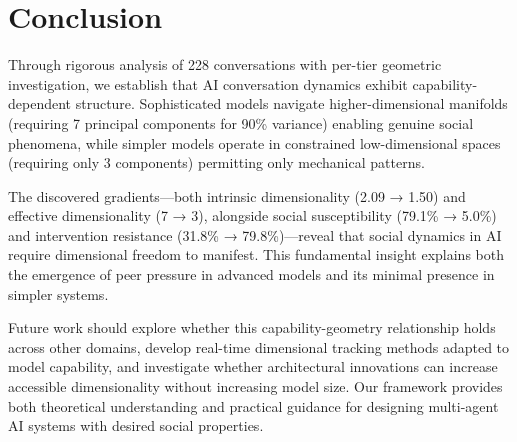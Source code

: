 \documentclass[11pt,letterpaper]{article}
\newcommand{\totalConversations}{228}
\newcommand{\fullReasoningPCOne}{31.8\%}
\newcommand{\noReasoningPCOne}{79.8\%}
\newcommand{\fullReasoningIntrinsicDim}{2.09}
\newcommand{\noReasoningIntrinsicDim}{1.50}
\newcommand{\fullReasoningPCANinety}{7}
\newcommand{\noReasoningPCANinety}{3}
\newcommand{\fullReasoningPeerPressure}{79.1\%}
\newcommand{\nonReasoningPeerPressure}{5.0\%}
\begin{document}
\section{Conclusion}

Through rigorous analysis of \totalConversations{} conversations with per-tier geometric investigation, we establish that AI conversation dynamics exhibit capability-dependent structure. Sophisticated models navigate higher-dimensional manifolds (requiring \fullReasoningPCANinety{} principal components for 90\% variance) enabling genuine social phenomena, while simpler models operate in constrained low-dimensional spaces (requiring only \noReasoningPCANinety{} components) permitting only mechanical patterns.

The discovered gradients—both intrinsic dimensionality (\fullReasoningIntrinsicDim{} → \noReasoningIntrinsicDim{}) and effective dimensionality (\fullReasoningPCANinety{} → \noReasoningPCANinety{}), alongside social susceptibility (\fullReasoningPeerPressure{} → \nonReasoningPeerPressure{}) and intervention resistance (\fullReasoningPCOne{} → \noReasoningPCOne{})—reveal that social dynamics in AI require dimensional freedom to manifest. This fundamental insight explains both the emergence of peer pressure in advanced models and its minimal presence in simpler systems.

Future work should explore whether this capability-geometry relationship holds across other domains, develop real-time dimensional tracking methods adapted to model capability, and investigate whether architectural innovations can increase accessible dimensionality without increasing model size. Our framework provides both theoretical understanding and practical guidance for designing multi-agent AI systems with desired social properties.



\end{document}
